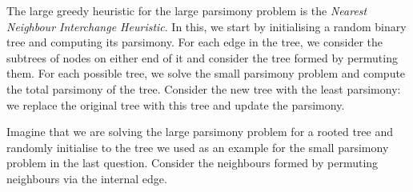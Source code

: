 \documentclass[10pt,\jkfside,a4paper]{article}
\begin{document}
\begin{enumerate}
    The large greedy heuristic for the large parsimony problem is the \textit{Nearest Neighbour Interchange Heuristic}. In this, we start by initialising a random binary tree and computing its parsimony. For each
    edge in the tree, we consider the subtrees of nodes on either end of it and consider the tree formed by permuting them. For each possible tree, we solve the small parsimony problem and compute the total
    parsimony of the tree. Consider the new tree with the least parsimony: we replace the original tree with this tree and update the parsimony.

    Imagine that we are solving the large parsimony problem for a rooted tree and randomly initialise to the tree we used as an example for the small parsimony problem in the last question. Consider the
    neighbours formed by permuting neighbours via the internal edge.

    \begin{figure}[H]

        \centering


        \centering


        \centering


    \end{figure}

\end{enumerate}
\end{document}
